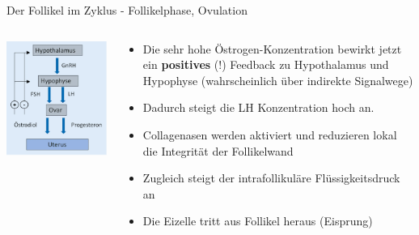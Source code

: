 \documentclass{beamer}
\begin{document}

\begin{frame}{Der Follikel im Zyklus - Follikelphase, Ovulation}
    
    
    \begin{columns}[c]

\begin{column}{4cm}

\begin{center}
\includegraphics[width=\textwidth]{hypothalamus_hypophyse_ovar.png}
\end{center}

\end{column}

\begin{column}{7cm}
\begin{itemize}
    \item 
Die sehr hohe Östrogen-Konzentration bewirkt jetzt ein \textbf{positives} (!) Feedback zu Hypothalamus und Hypophyse (wahrscheinlich  über indirekte Signalwege)

    \pause
    \item 
Dadurch steigt die LH Konzentration hoch an. 
    \item 
    Collagenasen werden aktiviert und reduzieren lokal die Integrität der Follikelwand
    \item 
Zugleich steigt der intrafollikuläre Flüssigkeitsdruck an

    \pause
    \item
    Die Eizelle tritt aus Follikel heraus (Eisprung)


\end{itemize}

\end{column}
\end{columns}


\end{frame}
\end{document}
